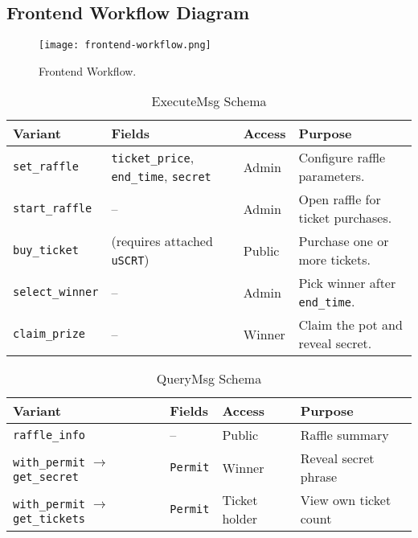 \documentclass{article}
\begin{document}
\newpage

\subsection{Frontend Workflow Diagram}
\begin{figure}[h]
  \vspace{0cm}
  \hspace{0cm}
  \texttt{[image: frontend-workflow.png]}
  \caption{Frontend Workflow.}
  \label{fig:Frontend Workflow Appendix}
\end{figure}

\newpage

\begin{table}[h]
  \centering
  \caption{ExecuteMsg Schema}
  \label{tab:ExecuteMsg Schema}
  \begin{tabular}{@{}llll@{}}
    \toprule
    \textbf{Variant} & \textbf{Fields} & \textbf{Access} & \textbf{Purpose} \\
    \midrule
    \texttt{set\_raffle} & \texttt{ticket\_price}, \texttt{end\_time}, \texttt{secret} & Admin & Configure raffle parameters. \\
    \midrule
    \texttt{start\_raffle} & -- & Admin & Open raffle for ticket purchases. \\
    \midrule
    \texttt{buy\_ticket} & (requires attached \texttt{uSCRT}) & Public & Purchase one or more tickets. \\
    \midrule
    \texttt{select\_winner} & -- & Admin & Pick winner after \texttt{end\_time}. \\
    \midrule
    \texttt{claim\_prize} & -- & Winner & Claim the pot and reveal secret. \\
    \bottomrule
  \end{tabular}
\end{table}

\begin{table}[h]
  \centering
  \caption{QueryMsg Schema}
  \label{tab:QueryMsg Schema}
  \begin{tabular}{@{}llll@{}}
    \toprule
    \textbf{Variant} & \textbf{Fields} & \textbf{Access} & \textbf{Purpose} \\
    \midrule
    \texttt{raffle\_info} & -- & Public & Raffle summary \\
    \midrule
    \texttt{with\_permit} $\rightarrow$ \texttt{get\_secret} & \texttt{Permit} & Winner & Reveal secret phrase \\
    \midrule
    \texttt{with\_permit} $\rightarrow$ \texttt{get\_tickets} & \texttt{Permit} & Ticket holder & View own ticket count \\
    \bottomrule
  \end{tabular}
\end{table}
\end{document}
